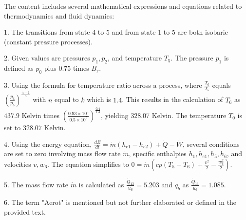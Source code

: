The content includes several mathematical expressions and equations related to thermodynamics and fluid dynamics:

1. The transitions from state 4 to 5 and from state 1 to 5 are both isobaric (constant pressure processes).

2. Given values are pressures \( p_1, p_2 \), and temperature \( T_5 \). The pressure \( p_1 \) is defined as \( p_0 \) plus \( 0.75 \) times \( B_r \).

3. Using the formula for temperature ratio across a process, where \( \frac{T_6}{T_5} \) equals \( \left( \frac{p_6}{p_5} \right)^{\frac{n-1}{n}} \) with \( n \) equal to \( k \) which is \( 1.4 \). This results in the calculation of \( T_6 \) as \( 437.9 \) Kelvin times \( \left( \frac{0.93 \times 10^5}{0.5 \times 10^5} \right)^{\frac{0.4}{1.4}} \), yielding \( 328.07 \) Kelvin. The temperature \( T_0 \) is set to \( 328.07 \) Kelvin.

4. Using the energy equation, \( \frac{dE}{dt} = \dot{m} \left( h_{e1} - h_{e2} \right) + \dot{Q} - \dot{W} \), several conditions are set to zero involving mass flow rate \( \dot{m} \), specific enthalpies \( h_1, h_{e1}, h_5, h_6 \), and velocities \( v, w_6 \). The equation simplifies to \( 0 = \dot{m} \left( cp(T_5 - T_6) + \frac{v^2}{2} - \frac{w_6^2}{2} \right) \).

5. The mass flow rate \( \dot{m} \) is calculated as \( \frac{\dot{Q}_{13}}{u_6} = 5.203 \) and \( q_b \) as \( \frac{\dot{Q}_{13}}{u_6} = 1.085 \).

6. The term "Aerot" is mentioned but not further elaborated or defined in the provided text.